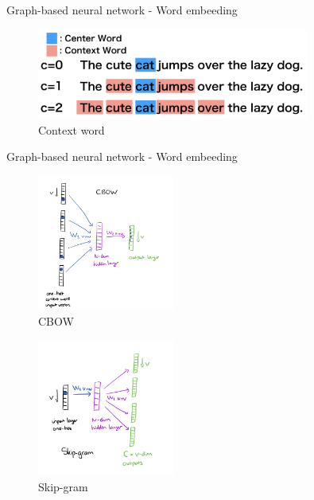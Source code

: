 \begin{frame}{Graph-based neural network - Word embeeding}
    \begin{figure}[htp]
        \centering
        \includegraphics[width=0.8\textwidth]{images/paper/zhang2019comprehensive/context-word.png}
        \caption{Context word}
    \end{figure}
\end{frame}

\begin{frame}{Graph-based neural network - Word embeeding}
    \begin{multicols}{2}
        \begin{figure}[htp]
            \centering
            \includegraphics[width=0.4\textwidth]{images/paper/zhang2019comprehensive/cbow.png}
            \caption{CBOW}
        \end{figure}

        \begin{figure}[htp]
            \centering
            \includegraphics[width=0.4\textwidth]{images/paper/zhang2019comprehensive/skip-gram.png}
            \caption{Skip-gram}
        \end{figure}
    \end{multicols}
\end{frame}

